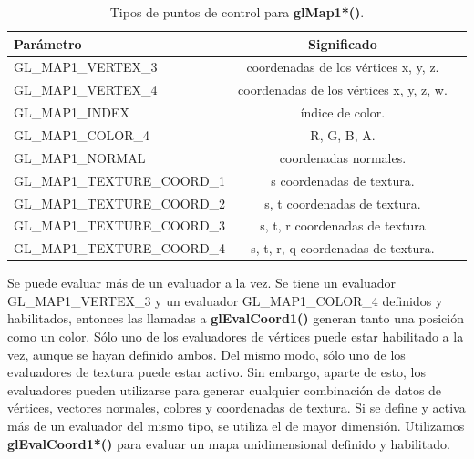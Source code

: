 \begin{table}[h]
\begin{center}
\caption{Tipos de puntos de control para \textbf{glMap1*()}.}
	{\color{grayblack}
\begin{tabular}{ p{6.5cm} cc }
\toprule
\textbf{Parámetro } & \textbf{Significado} \\
\midrule
GL\_MAP1\_VERTEX\_3 & coordenadas de los vértices x, y, z.\\

GL\_MAP1\_VERTEX\_4 & coordenadas de los vértices x, y, z, w. \\
GL\_MAP1\_INDEX & índice de color. \\

GL\_MAP1\_COLOR\_4 & R, G, B, A. \\

GL\_MAP1\_NORMAL & coordenadas normales. \\

GL\_MAP1\_TEXTURE\_COORD\_1 & s coordenadas de textura. \\

GL\_MAP1\_TEXTURE\_COORD\_2 & s, t coordenadas de textura. \\

GL\_MAP1\_TEXTURE\_COORD\_3  & s, t, r coordenadas de textura \\

GL\_MAP1\_TEXTURE\_COORD\_4  & s, t, r, q coordenadas de textura. \\
\bottomrule
\end{tabular}}
\label{tab:coeficientes}
\end{center}
\end{table}

Se puede evaluar más de un evaluador a la vez. Se tiene un evaluador GL\_MAP1\_VERTEX\_3 y un evaluador GL\_MAP1\_COLOR\_4 definidos y habilitados, entonces las llamadas a \textbf{glEvalCoord1()} generan tanto una posición como un color. Sólo uno de los evaluadores de vértices puede estar habilitado a la vez, aunque se hayan definido ambos. Del mismo modo, sólo uno de los evaluadores de textura puede estar activo. Sin embargo, aparte de esto, los evaluadores pueden utilizarse para generar cualquier combinación de datos de vértices, vectores normales, colores y coordenadas de textura. Si se define y activa más de un evaluador del mismo tipo, se utiliza el de mayor dimensión. Utilizamos \textbf{glEvalCoord1*()} para evaluar un mapa unidimensional definido y habilitado.

